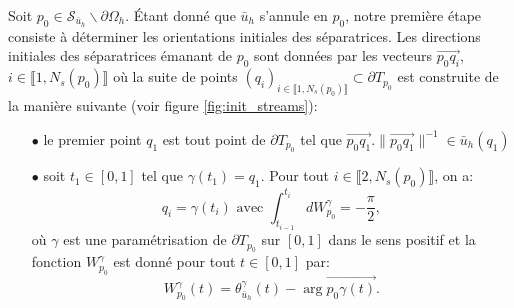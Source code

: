 Soit $p_0\in\mathcal{S}_{\bar{u}_h}\backslash\partial\Omega_h$. Étant donné que $\bar{u}_h$ s'annule en $p_0$, notre première étape consiste à déterminer les orientations initiales des séparatrices. Les directions initiales des séparatrices émanant de $p_0$ sont données par les vecteurs $\overrightarrow{p_0q_i}$, $i\in\llbracket 1, N_s(p_0) \rrbracket$ où la suite de points $(q_i)_{i\in\llbracket 1, N_s(p_0)\rrbracket}\subset\partial T_{p_0}$ est construite de la manière suivante (voir figure \ref{fig:init_streams}):\\
\begin{itemize}
    \item[$\bullet$] le premier point $q_1$ est tout point de $\partial T_{p_0}$ tel que $\overrightarrow{p_0q_1}.\|\overrightarrow{p_0q_1}\|^{-1}\in\bar{u}_h(q_1)$\\
    \item[$\bullet$] soit $t_1\in[0, 1]$ tel que $\gamma(t_1)=q_1$. Pour tout $i\in\llbracket 2, N_s(p_0)\rrbracket$, on a:
    $$
    q_i=\gamma(t_i)\mbox{ avec }\int_{t_{i-1}}^{t_i}dW_{p_0}^\gamma=-\frac{\pi}{2},
    $$
    où $\gamma$ est une paramétrisation de $\partial T_{p_0}$ sur $[0, 1]$ dans le sens positif et la fonction $W^\gamma_{p_0}$ est donné pour tout $t\in[0, 1]$ par:
    $$
    W_{p_0}^\gamma(t)=\theta^\gamma_{\bar{u}_h}(t)-\arg \overrightarrow{p_0\gamma(t)}.
    $$


\end{itemize}
